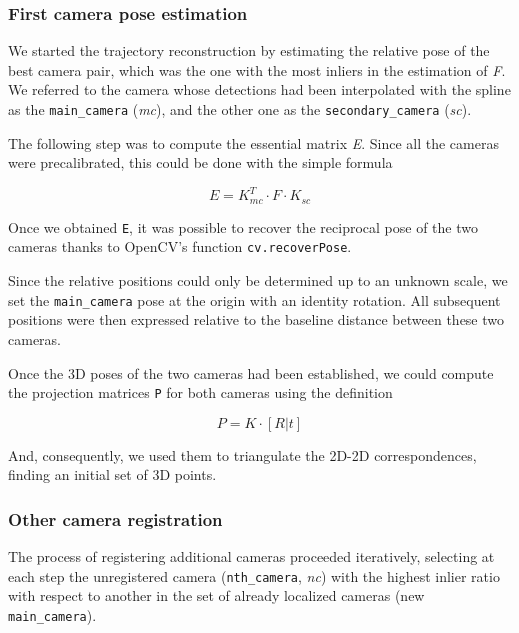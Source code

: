 \documentclass[11pt]{article}
\begin{document}
\subsubsection{First camera pose estimation}

We started the trajectory reconstruction by estimating the relative pose of the best camera pair, which was the one with the most inliers in the estimation of \textit{F}. We referred to the camera whose detections had been interpolated with the spline as the \texttt{main\_camera} (\textit{mc}), and the other one as the \texttt{secondary\_camera} (\textit{sc}).

The following step was to compute the essential matrix \textit{E}. Since all the cameras were precalibrated, this could be done with the simple formula

\begin{equation}
    E = K_{mc}^T \cdot F \cdot K_{sc}
\end{equation}

Once we obtained \texttt{E}, it was possible to recover the reciprocal pose of the two cameras thanks to OpenCV's function \texttt{cv.recoverPose}.

Since the relative positions could only be determined up to an unknown scale, we set the \texttt{main\_camera} pose at the origin with an identity rotation. All subsequent positions were then expressed relative to the baseline distance between these two cameras.

Once the 3D poses of the two cameras had been established, we could compute the projection matrices \texttt{P} for both cameras using the definition

\begin{equation}
    P = K \cdot [R | t]
\end{equation}

And, consequently, we used them to triangulate the 2D-2D correspondences, finding an initial set of 3D points.

\subsubsection{Other camera registration}

The process of registering additional cameras proceeded iteratively, selecting at each step the unregistered camera (\texttt{nth\_camera}, \textit{nc}) with the highest inlier ratio with respect to another in the set of already localized cameras (new \texttt{main\_camera}).
\end{document}
